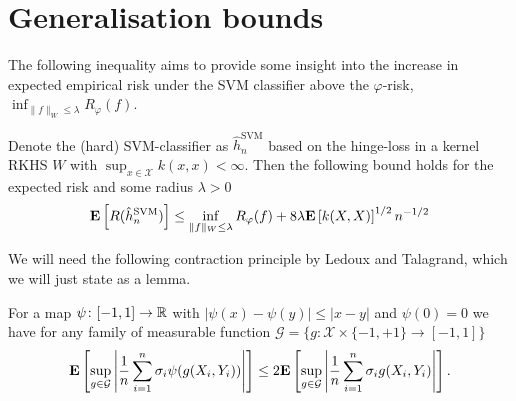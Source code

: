 \section{Generalisation bounds}
The following inequality aims to provide some insight into the increase in expected empirical risk under the SVM classifier above the $\varphi$-risk, $\inf_{\|f\|_W\leq \lambda} R_\varphi(f)$.

\begin{theorem}\label{eq:excess_risk}
Denote the (hard) SVM-classifier as $\hat{h}_n^\mathrm{SVM}$ based on the hinge-loss in a kernel RKHS $W$ with $\sup_{x \in \mathcal{X}} k(x, x) < \infty$. Then the following bound holds for the expected risk and some radius $\lambda> 0$
\begin{equation*}
	\mathbf{E}\left[R(\hat{h}_n^\mathrm{SVM})\right] \leq \inf_{\|f\|_W\leq \lambda} R_\varphi(f) + 8 \lambda\mathbf{E}\left[k(X, X)\right]^{1/2}n^{-1/2}
\end{equation*}
\end{theorem}

We will need the following contraction principle by Ledoux and Talagrand, which we will just state as a lemma.
\begin{lemma}\label{lemma:contraction}
For a map $\psi\colon [-1, 1] \rightarrow \mathbb{R}$ with $|\psi(x) - \psi(y)|\leq | x- y|$ and $\psi(0) = 0$ we have for any family of measurable function $\mathcal{G} = \{g: \mathcal{X} \times \{-1, +1\} \rightarrow [-1, 1]\}$
\begin{equation*}
	\mathbf{E}\left[\sup_{g\in \mathcal{G}}\left|\frac{1}{n}\sum_{i=1}^n\sigma_i\psi(g(X_i, Y_i))\right|\right] \leq 2\mathbf{E}\left[\sup_{g\in \mathcal{G}}\left|\frac{1}{n}\sum_{i=1}^n\sigma_ig(X_i, Y_i)\right|\right].
\end{equation*}
\end{lemma}

